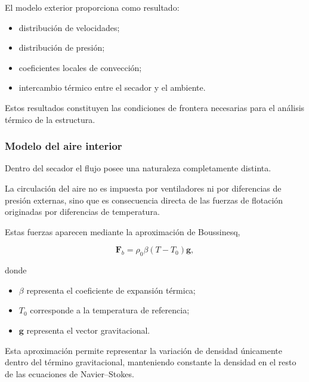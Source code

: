 El modelo exterior proporciona como resultado:

\begin{itemize}

\item distribución de velocidades;

\item distribución de presión;

\item coeficientes locales de convección;

\item intercambio térmico entre el secador y el ambiente.

\end{itemize}

Estos resultados constituyen las condiciones de frontera necesarias para el análisis térmico de la estructura.

\subsubsection{Modelo del aire interior}

Dentro del secador el flujo posee una naturaleza completamente distinta.

La circulación del aire no es impuesta por ventiladores ni por diferencias de presión externas, sino que es consecuencia directa de las fuerzas de flotación originadas por diferencias de temperatura.

Estas fuerzas aparecen mediante la aproximación de Boussinesq,

\begin{equation}
\mathbf{F}_b
=
\rho_0
\beta
(T-T_0)
\mathbf g,
\end{equation}

donde

\begin{itemize}

\item $\beta$ representa el coeficiente de expansión térmica;

\item $T_0$ corresponde a la temperatura de referencia;

\item $\mathbf g$ representa el vector gravitacional.

\end{itemize}

Esta aproximación permite representar la variación de densidad únicamente dentro del término gravitacional, manteniendo constante la densidad en el resto de las ecuaciones de Navier--Stokes.

